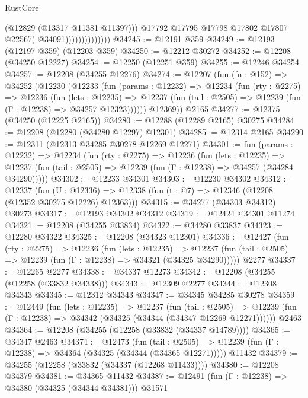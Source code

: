 \begin{lexlean}{RustCore}
\begin{coremodule}
                                    (@12829 (@13317 @11381 @11397)))
                                  @17792
                                  @17795
                                  @17798
                                  @17802
                                  @17807
                                  @22567)
                                @34091))))))))))))))
@34245 := @12191 @359
@34249 := @12193 (@12197 @359) (@12203 @359)
@34250 := @12212 @30272
@34252 := @12208 (@34250 @12227)
@34254 := @12250 (@12251 @359)
@34255 := @12246 @34254
@34257 := @12208 (@34255 @12276)
@34274 := @12207
    (fun (fn : @152) =>
    @34252
      (@12230
        (@12233
          (fun (params : @12232) =>
          @12234
            (fun (rty : @2275) =>
            @12236
              (fun (lets : @12235) =>
              @12237 (fun (tail : @2505) => @12239 (fun (Γ : @12238) => @34257 @12323))))))
        @12369))
    @2165
@34277 := @12375 (@34250 (@12225 @2165))
@34280 := @12288 (@12289 @2165) @30275
@34284 := @12208 (@12280 (@34280 @12297) @12301)
@34285 := @12314 @2165
@34290 := @12311 (@12313 @34285 @30278 @12269 @12271)
@34301 := fun (params : @12232) =>
  @12234
    (fun (rty : @2275) =>
    @12236
      (fun (lets : @12235) =>
      @12237 (fun (tail : @2505) => @12239 (fun (Γ : @12238) => @34257 (@34284 @34290)))))
@34302 := @12233 @34301
@34303 := @12230 @34302
@34312 := @12337
    (fun (U : @12336) => @12338 (fun (t : @7) => @12346 (@12208 (@12352 @30275 @12226) @12363)))
@34315 := @34277 (@34303 @34312) @30273
@34317 := @12193 @34302 @34312
@34319 := @12424 @34301 @11274
@34321 := @12208 (@34255 @33834)
@34322 := @34280 @33837
@34323 := @12280 @34322
@34325 := @12208 (@34323 @12301)
@34336 := @12427
    (fun (rty : @2275) =>
    @12236
      (fun (lets : @12235) =>
      @12237 (fun (tail : @2505) => @12239 (fun (Γ : @12238) => @34321 (@34325 @34290)))))
    @2277
@34337 := @12265 @2277
@34338 := @34337 @12273
@34342 := @12208 (@34255 (@12258 (@33832 @34338)))
@34343 := @12309 @2277
@34344 := @12308 @34343
@34345 := @12312 @34343
@34347 := @34345 @34285 @30278
@34359 := @12449
    (fun (lets : @12235) =>
    @12237
      (fun (tail : @2505) =>
      @12239 (fun (Γ : @12238) => @34342 (@34325 (@34344 (@34347 @12269 @12271))))))
    @2463
@34364 := @12208 (@34255 (@12258 (@33832 (@34337 @14789))))
@34365 := @34347 @2463
@34374 := @12473
    (fun (tail : @2505) => @12239 (fun (Γ : @12238) => @34364 (@34325 (@34344 (@34365 @12271)))))
    @11432
@34379 := @34255 (@12258 (@33832 (@34337 (@12268 @11433))))
@34380 := @12208 @34379
@34381 := @34365 @11432
@34387 := @12491 (fun (Γ : @12238) => @34380 (@34325 (@34344 @34381))) @31571

\end{coremodule}
\end{lexlean}
